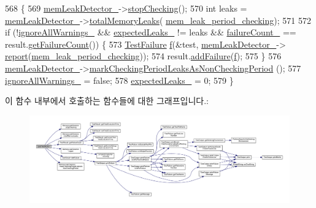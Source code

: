 \begin{DoxyCode}
568 \{
569     \hyperlink{class_memory_leak_warning_plugin_afe143d17de3accfcf9be8c7d476e26fa}{memLeakDetector\_}->\hyperlink{class_memory_leak_detector_a9e85551d474d895ba8852b8e56481c7c}{stopChecking}();
570     \textcolor{keywordtype}{int} leaks = \hyperlink{class_memory_leak_warning_plugin_afe143d17de3accfcf9be8c7d476e26fa}{memLeakDetector\_}->\hyperlink{class_memory_leak_detector_a7b0c5d9c4d678d6e0081802416660803}{totalMemoryLeaks}(
      \hyperlink{_memory_leak_detector_8h_ab248e6cc6c6699b88b002286d8a3ed76ad140291a5b8a535af47f9858220f2639}{mem\_leak\_period\_checking});
571 
572     \textcolor{keywordflow}{if} (!\hyperlink{class_memory_leak_warning_plugin_ab3c6236220c0602b50a621c5d7fbda34}{ignoreAllWarnings\_} && \hyperlink{class_memory_leak_warning_plugin_a7d18a67c3be157258b86787ef367d540}{expectedLeaks\_} != leaks && 
      \hyperlink{class_memory_leak_warning_plugin_a006a6550e4e3d4de173c35b50c1c90b0}{failureCount\_} == result.\hyperlink{class_test_result_abb8c64011fa53bb1950110a564b56027}{getFailureCount}()) \{
573         \hyperlink{class_test_failure}{TestFailure} \hyperlink{_i_e_e_e754_plugin_test__c_8c_ac9a1bf077a6110a5f27b9bdd6030aa83}{f}(&test, \hyperlink{class_memory_leak_warning_plugin_afe143d17de3accfcf9be8c7d476e26fa}{memLeakDetector\_}->
      \hyperlink{class_memory_leak_detector_acc70330c27080c4b09b96342929dc9ca}{report}(\hyperlink{_memory_leak_detector_8h_ab248e6cc6c6699b88b002286d8a3ed76ad140291a5b8a535af47f9858220f2639}{mem\_leak\_period\_checking}));
574         result.\hyperlink{class_test_result_a72cba7b88c906f8f5af977d360bd8c23}{addFailure}(\hyperlink{_i_e_e_e754_plugin_test__c_8c_ac9a1bf077a6110a5f27b9bdd6030aa83}{f});
575     \}
576     \hyperlink{class_memory_leak_warning_plugin_afe143d17de3accfcf9be8c7d476e26fa}{memLeakDetector\_}->\hyperlink{class_memory_leak_detector_a6db202697cf20e8d84748b129c403545}{markCheckingPeriodLeaksAsNonCheckingPeriod}
      ();
577     \hyperlink{class_memory_leak_warning_plugin_ab3c6236220c0602b50a621c5d7fbda34}{ignoreAllWarnings\_} = \textcolor{keyword}{false};
578     \hyperlink{class_memory_leak_warning_plugin_a7d18a67c3be157258b86787ef367d540}{expectedLeaks\_} = 0;
579 \}
\end{DoxyCode}


이 함수 내부에서 호출하는 함수들에 대한 그래프입니다.\+:
\nopagebreak
\begin{figure}[H]
\begin{center}
\leavevmode
\includegraphics[width=350pt]{class_memory_leak_warning_plugin_a488f8809f966fc52513ee74afa87cda3_cgraph}
\end{center}
\end{figure}


